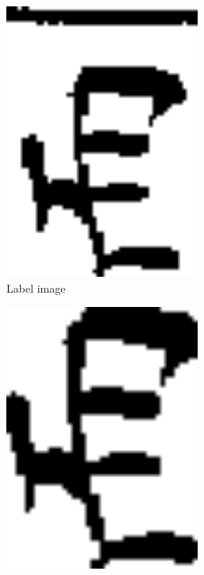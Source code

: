  \begin{figure}[ht]
  \centering
  \begin{subfigure}{0.24\textwidth}
    \centering
    \includegraphics[width=0.7\textwidth]{./images/experiment/label.png}
    \caption{Label image}
    \label{fig:experiment:label}
  \end{subfigure}
  \begin{subfigure}{0.24\textwidth}
    \centering
    \includegraphics[width=0.7\textwidth]{./images/experiment/found.png}

\end{subfigure}
\end{figure}

